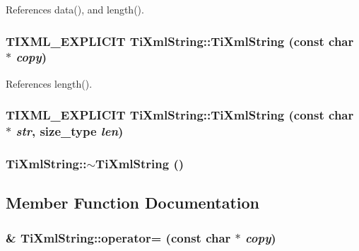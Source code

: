 References data(), and length().
\subsubsection[TiXmlString]{\setlength{\rightskip}{0pt plus 5cm}TIXML\_\-EXPLICIT TiXmlString::TiXmlString (const char $\ast$ {\em copy})\hspace{0.3cm}{\tt  [inline]}}\label{classTiXmlString_a3b32bd2891a757c9f36c21db44c81d2}




References length().
\subsubsection[TiXmlString]{\setlength{\rightskip}{0pt plus 5cm}TIXML\_\-EXPLICIT TiXmlString::TiXmlString (const char $\ast$ {\em str}, \/  {\bf size\_\-type} {\em len})\hspace{0.3cm}{\tt  [inline]}}\label{classTiXmlString_4b17ea5c5db986f14827223dfa8f1547}


\subsubsection[$\sim$TiXmlString]{\setlength{\rightskip}{0pt plus 5cm}TiXmlString::$\sim$TiXmlString ()\hspace{0.3cm}{\tt  [inline]}}\label{classTiXmlString_7ac03f581ca3422c4808162ab14f3450}




\subsection{Member Function Documentation}
\subsubsection[operator=]{\& TiXmlString::operator= (const char $\ast$ {\em copy})\hspace{0.3cm}{\tt  [inline]}}\label{classTiXmlString_e0bc6147afc0ec2aa0da3a3c0a8fcfb0}




